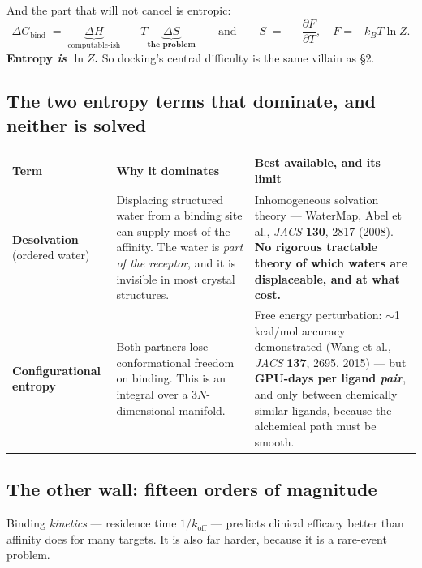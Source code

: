\noindent And the part that will not cancel is entropic:
\[
\Delta G_{\text{bind}} \;=\; \underbrace{\Delta H}_{\text{computable-ish}} \;-\; T\underbrace{\Delta S}_{\textbf{the problem}}
\qquad\text{and}\qquad S \;=\; -\frac{\partial F}{\partial T},\quad F=-k_BT\ln Z .
\]
\textbf{Entropy \emph{is} $\ln Z$.} So docking's central difficulty is the same villain as §2.

\subsection{The two entropy terms that dominate, and neither is solved}

\begin{center}\small
\begin{tabular}{@{}>{\raggedright\arraybackslash}p{4.0cm}>{\raggedright\arraybackslash}p{6.3cm}>{\raggedright\arraybackslash}p{6.0cm}@{}}
\toprule
\rowcolor{nano!13}
\textbf{\color{nano}Term} & \textbf{\color{nano}Why it dominates} & \textbf{\color{nano}Best available, and its limit}\\
\midrule
\textbf{Desolvation} \newline (ordered water) &
 Displacing structured water from a binding site can supply most of the affinity. The water is
 \emph{part of the receptor}, and it is invisible in most crystal structures. &
 Inhomogeneous solvation theory --- WaterMap, Abel et al., \textit{JACS} \textbf{130}, 2817 (2008).
 \textbf{No rigorous tractable theory of which waters are displaceable, and at what cost.}\\
\textbf{Configurational entropy} &
 Both partners lose conformational freedom on binding. This is an integral over a $3N$-dimensional
 manifold. &
 Free energy perturbation: $\sim$1 kcal/mol accuracy demonstrated (Wang et al., \textit{JACS}
 \textbf{137}, 2695, 2015) --- but \textbf{GPU-days per ligand \emph{pair}}, and only between
 chemically similar ligands, because the alchemical path must be smooth.\\
\bottomrule
\end{tabular}
\end{center}

\subsection{The other wall: fifteen orders of magnitude}

Binding \emph{kinetics} --- residence time $1/k_{\text{off}}$ --- predicts clinical efficacy better
than affinity does for many targets. It is also far harder, because it is a rare-event problem.

